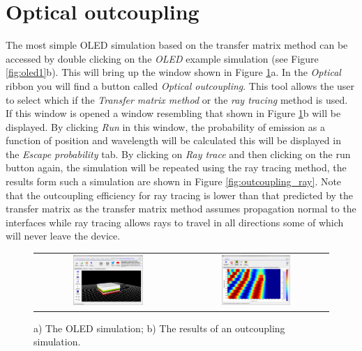 \section{Optical outcoupling}
The most simple OLED simulation based on the transfer matrix method can be accessed by double clicking on the \emph{OLED} example simulation (see Figure \ref{fig:oled1}b). This will bring up the window shown in Figure \ref{fig:oled2}a. In the \emph{Optical} ribbon you will find a button called \emph{Optical outcoupling}. This tool allows the user to select which if the \emph{Transfer matrix method} or the \emph{ray tracing} method is used. If this window is opened a window resembling that shown in Figure \ref{fig:oled2}b will be displayed. By clicking \emph{Run} in this window, the probability of emission as a function of position and wavelength will be calculated this will be displayed in the \emph{Escape probability} tab. By clicking on \emph{Ray trace} and then clicking on the run button again, the simulation will be repeated using the ray tracing method, the results form such a simulation are shown in Figure \ref{fig:outcoupling_ray}. Note that the outcoupling efficiency for ray tracing is lower than that predicted by the transfer matrix as the transfer matrix method assumes propagation normal to the interfaces while ray tracing allows rays to travel in all directions some of which will never leave the device.

\begin{figure}[H]
\centering
\begin{tabular}{ c c }

\includegraphics[width=0.5\textwidth,height=0.4\textwidth]{./images/oled/oled_start_example.png}

&
\includegraphics[width=0.5\textwidth,height=0.4\textwidth]{./images/oled/transfer_matrix.png}

\\
\end{tabular}
\caption{a) The OLED simulation; b) The results of an outcoupling simulation.}
\label{fig:oled2}
\end{figure}

